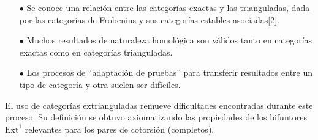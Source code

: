 \documentclass[preview]{standalone}
\begin{document}
\begin{center}
\begin{itemize}
                        \item[$\bullet$] Se conoce una relación entre las categorías exactas y las trianguladas, dada por las categorías de Frobenius y sus categorías estables asociadas[2].
                        \item[$\bullet$] Muchos resultados de naturaleza homológica son válidos tanto en categorías exactas como en categorías trianguladas.
                        \item[$\bullet$] Los procesos de ``adaptación de pruebas'' para transferir resultados entre un tipo de categoría y otra suelen ser difíciles.
                        \end{itemize}
                        El uso de categorías extrianguladas remueve dificultades encontradas durante este proceso. Su definición se obtuvo axiomatizando las propiedades de los bifuntores $\text{Ext}^1$ relevantes para los pares de cotorsión (completos).
\end{center}
\end{document}
